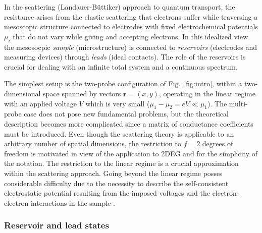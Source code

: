 \documentclass[a4paper,10pt]{article}
\newcommand{\br}{\mathbf{r}}
\newcommand{\nin}{\noindent}
\begin{document}
In the scattering (Landauer-B\"uttiker) approach to quantum transport, the resistance arises from the elastic scattering that electrons suffer while traversing a mesoscopic structure connected to electrodes with fixed electrochemical potentials $\mu_i$ that do not vary while giving and accepting electrons. In this idealized view the mesosocpic {\it sample} (microstructure) is connected to {\it reservoirs} (electrodes and measuring devices) through {\it leads} (ideal contacts). The role of the reservoirs is crucial for dealing with an infinite total system and a continuous spectrum.   

\nin The simplest setup is the two-probe configuration of Fig.~\ref{fig:intro}, within a two-dimensional space spanned by vectors $\br=(x,y)$, operating in the linear regime with an applied voltage $V$ which is very small ($\mu_1\!-\!\mu_2=eV \ll \mu_1$). The multi-probe case \cite{Butt86} does not pose new fundamental problems, but the theoretical description becomes more complicated since a matrix of conductance coefficients must be introduced. Even though the scattering theory is applicable to an arbitrary number of spatial dimensions, the restriction to $f=2$ degrees of freedom is motivated in view of the application to 2DEG and for the simplicity of the notation. The restriction to the linear regime is a crucial approximation within the scattering approach. Going beyond the linear regime posses considerable difficulty due to the necessity to describe the self-consistent electrostatic potential resulting from the imposed voltages and the electron-electron interactions in the sample \cite{christen1996a}. 

\subsubsection{Reservoir and lead states}
\end{document}
